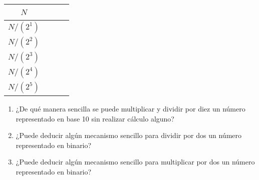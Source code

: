 \documentclass[12pt]{article}
\begin{document}
\begin{enumerate}
\begin{center}
\begin{tabular}[t]{|c|c|c|}
            \hline

                $N$ & \hspace{9em}~ &\hspace{9em}~\\

            \hline

                $N/(2^1)$ & ~ &~\\

            \hline

                $N/(2^2)$ & ~ &~\\

            \hline

                $N/(2^3)$ & ~ &~\\

            \hline

                $N/(2^4)$ & ~ &~\\

            \hline

                $N/(2^5)$ & ~ &~\\

            \hline

            \end{tabular}

        \end{center}

        \begin{enumerate}

            \item ¿De qué manera sencilla se puede multiplicar y dividir por diez un
                número representado en base 10 sin realizar cálculo alguno?

            \item ¿Puede deducir algún mecanismo sencillo para dividir por dos un
                número representado en binario?

            \item ¿Puede deducir algún mecanismo sencillo para multiplicar por dos un
                número representado en binario?

        \end{enumerate}

\end{enumerate}
\end{document}
